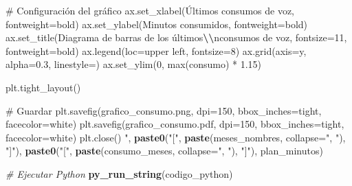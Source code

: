 \documentclass[
]{article}
\newenvironment{Shaded}{\begin{snugshade}}{\end{snugshade}}
\newcommand{\AttributeTok}[1]{\textcolor[rgb]{0.13,0.29,0.53}{#1}}
\newcommand{\CommentTok}[1]{\textcolor[rgb]{0.56,0.35,0.01}{\textit{#1}}}
\newcommand{\FunctionTok}[1]{\textcolor[rgb]{0.13,0.29,0.53}{\textbf{#1}}}
\newcommand{\NormalTok}[1]{#1}
\newcommand{\SpecialCharTok}[1]{\textcolor[rgb]{0.81,0.36,0.00}{\textbf{#1}}}
\newcommand{\StringTok}[1]{\textcolor[rgb]{0.31,0.60,0.02}{#1}}
\begin{document}
\begin{Shaded}
\begin{Highlighting}[]
\StringTok{\# Configuración del gráfico}
\StringTok{ax.set\_xlabel(\textquotesingle{}Últimos consumos de voz\textquotesingle{}, fontweight=\textquotesingle{}bold\textquotesingle{})}
\StringTok{ax.set\_ylabel(\textquotesingle{}Minutos consumidos\textquotesingle{}, fontweight=\textquotesingle{}bold\textquotesingle{})}
\StringTok{ax.set\_title(\textquotesingle{}Diagrama de barras de los últimos}\SpecialCharTok{\textbackslash{}\textbackslash{}}\StringTok{nconsumos de voz\textquotesingle{}, fontsize=11, fontweight=\textquotesingle{}bold\textquotesingle{})}
\StringTok{ax.legend(loc=\textquotesingle{}upper left\textquotesingle{}, fontsize=8)}
\StringTok{ax.grid(axis=\textquotesingle{}y\textquotesingle{}, alpha=0.3, linestyle=\textquotesingle{}{-}{-}\textquotesingle{})}
\StringTok{ax.set\_ylim(0, max(consumo) * 1.15)}

\StringTok{plt.tight\_layout()}

\StringTok{\# Guardar}
\StringTok{plt.savefig(\textquotesingle{}grafico\_consumo.png\textquotesingle{}, dpi=150, bbox\_inches=\textquotesingle{}tight\textquotesingle{}, facecolor=\textquotesingle{}white\textquotesingle{})}
\StringTok{plt.savefig(\textquotesingle{}grafico\_consumo.pdf\textquotesingle{}, dpi=150, bbox\_inches=\textquotesingle{}tight\textquotesingle{}, facecolor=\textquotesingle{}white\textquotesingle{})}
\StringTok{plt.close()}
\StringTok{"}\NormalTok{,}
\FunctionTok{paste0}\NormalTok{(}\StringTok{"[\textquotesingle{}"}\NormalTok{, }\FunctionTok{paste}\NormalTok{(meses\_nombres, }\AttributeTok{collapse=}\StringTok{"\textquotesingle{}, \textquotesingle{}"}\NormalTok{), }\StringTok{"\textquotesingle{}]"}\NormalTok{),}
\FunctionTok{paste0}\NormalTok{(}\StringTok{"["}\NormalTok{, }\FunctionTok{paste}\NormalTok{(consumo\_meses, }\AttributeTok{collapse=}\StringTok{", "}\NormalTok{), }\StringTok{"]"}\NormalTok{),}
\NormalTok{plan\_minutos)}

\CommentTok{\# Ejecutar Python}
\FunctionTok{py\_run\_string}\NormalTok{(codigo\_python)}
\end{Highlighting}
\end{Shaded}
\end{document}
